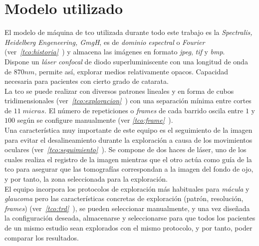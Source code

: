 \section{Modelo utilizado}
El modelo de máquina de \gls{tco} utilizada durante todo este trabajo
es la \emph{Spectralis, Heidelberg Engeneering, GmgH}, es de
\emph{dominio espectral} o \emph{Fourier}
(ver\emph{~\ref{tco:historia}~}) y almacena las
imágenes en formato \emph{jpeg},
\emph{tif} y \emph{bmp}.\\
Dispone un \emph{láser confocal} de diodo superluminiscente con una
longitud de onda de $870nm$, permite así, explorar medios
relativamente opacos. Capacidad necesaria para pacientes con cierto
grado de catarata.\\
La \gls{tco} se puede realizar con diversos patrones lineales y en
forma de cubos tridimensionales
(ver\emph{~\ref{tco:exploracion}~}) con una
separación mínima entre cortes de $11\;micras$. El número de
repeticiones o \emph{frames} de cada barrido oscila entre $1$ y $100$
según se configure manualmente (ver \emph{\ref{tco:frame}~}).\\
Una característica muy importante de este equipo es el seguimiento de
la imagen para evitar el desalineamiento durante la exploración a
causa de los movimientos oculares
(ver~\emph{\ref{tco:seguimiento}~}). Se
compone de dos haces de láser, uno de los cuales realiza el registro
de la imagen mientras que el otro actúa como guía de la \gls{tco} para
asegurar que las tomografías correspondan a la imagen del fondo de
ojo, y por
tanto, la zona seleccionada para la exploración.\\
El equipo incorpora los protocolos de exploración más habituales para
\emph{mácula} y \emph{\gls{glaucoma}} pero las características
concretas de exploración (patrón, resolución, \emph{frames})
(ver\emph{~\ref{tco:trd}~}), se pueden seleccionar
manualmente, y una vez diseñada la configuración deseada, almacenarse
y seleccionarse para que todos los pacientes de un mismo estudio sean
explorados con el mismo protocolo, y por tanto, poder comparar los
resultados.

